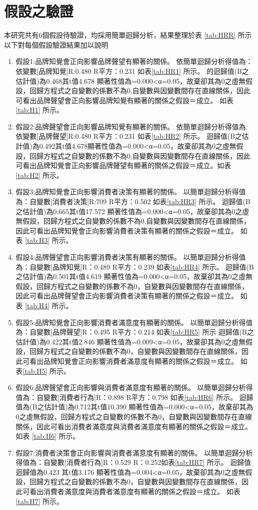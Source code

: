 \section{假設之驗證}
本研究共有6個假設待驗證，均採用簡單迴歸分析，結果整理於表 \ref{tab:HRR} 所示以下對每個假設驗證結果加以說明
\begin{enumerate}
\item 假設1:品牌知覺會正向影響品牌聲望有顯著的關係。
依簡單迴歸分析得值為：依變數[品牌知覺]R:0.480 R平方：0.231 如表\ref{tab:HR1}  所示。
的迴歸值(B之估計值)為0.468其t值4.678 顯著性值為=0.000<α=0.05，故棄卻其為0之虛無假設，回歸方程式之自變數的係數不為0,自變數與因變數間存在直線關係，因此可看出品牌聲望會正向影響品牌知覺有顯著的關係之假設＝成立。 如表\ref{tab:H1}  所示。
\item 假設2:品牌聲望會正向影響品牌知覺有顯著的關係。
依簡單迴歸分析得值為:依變數[品牌聲望]R:0.480 R平方：0.231 如表\ref{tab:HR2}  所示。
迴歸值(B之估計值)為0.492其t值4.678顯著性值為=0.000<α=0.05，故棄卻其為0之虛無假設，回歸方程式之自變數的係數不為0,自變數與因變數間存在直線關係，因此可看出品牌知覺會正向影響品牌聲望有顯著的關係之假設＝成立。如表\ref{tab:H2}  所示。
\item 假設3:品牌知覺會正向影響消費者決策有顯著的關係。
以簡單迴歸分析得值為：自變數[消費者決策]R:709 R平方：0.502 如表\ref{tab:HR3}  所示。
迴歸值(B之估計值)為0.665其t值17.572 顯著性值為=0.000<α=0.05，故棄卻其為0之虛無假設，回歸方程式之自變數的係數不為0,自變數與因變數間存在直線關係，因此可看出品牌知覺會正向影響消費者決策有顯著的關係之假設＝成立。 如表 \ref{tab:H3}  所示。
\item 假設4:品牌聲望會正向影響消費者決策有顯著的關係。
以簡單迴歸分析得值為：自變數[品牌知覺]R：0.489 R平方：0.239 如表\ref{tab:HR4}  所示。
迴歸值(B之估計值)為0.501其t值4.619 顯著性值為=0.000<α=0.05，故棄卻其為0之虛無假設，回歸方程式之自變數的係數不為0，自變數與因變數間存在直線關係，因此可看出品牌聲望會正向影響消費者決策有顯著的關係之假設＝成立。 如表 \ref{tab:H4}  所示。
\item 假設5:品牌知覺會正向影響消費者滿意度有顯著的關係。
以簡單迴歸分析得值為：自變數[品牌聲望]R：0.495 R平方：0.214 如表\ref{tab:HR5}  所示
迴歸值(B之估計值)為0.422其t值2.846 顯著性值為=0.009<α=0.05，故棄卻其為0之虛無假設，回歸方程式之自變數的係數不為0，自變數與因變數間存在直線關係，因此可看出品牌知覺會正向影響消費者滿意度有顯著的關係之假設＝成立。 如表\ref{tab:H5}  所示。
\item 假設6:品牌聲望會正向影響與消費者滿意度有顯著的關係。
以簡單迴歸分析得值為：自變數[消費者行為]R：0.898 R平方：0.798 如表\ref{tab:HR6}  所示。
迴歸值為(B之估計值)為0.712其t值10.390 顯著性值為=0.000<α=0.05，故棄卻其為0之虛無假設，回歸方程式之自變數的係數不為0，自變數與因變數間存在直線關係，因此可看出消費者滿意度與消費者滿意度有顯著的關係之假設＝成立。 如表 \ref{tab:H6}  所示。
\item 假設7:消費者決策會正向影響與消費者滿意度有顯著的關係。
以簡單迴歸分析得值為：自變數[消費者行為]R：0.529 R：0.252如表\ref{tab:HR7}  所示。
迴歸值迴歸值為0.423 其t值3.176 顯著性值為=0.004<α=0.05，故棄卻其為0之虛無假設，回歸方程式之自變數的係數不為0，自變數與因變數間存在直線關係，因此可看出消費者滿意度與消費者滿意度有顯著的關係之假設＝成立。 如表 \ref{tab:H7}  所示。

\end{enumerate}


